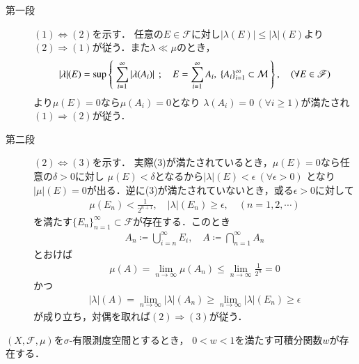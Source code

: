 	\begin{prf}\mbox{}
		\begin{description}
			\item[第一段]
				$(1) \Leftrightarrow (2)$を示す．
				任意の$E \in \mathscr{F}$に対し$|\lambda(E)| \leq |\lambda|(E)$より
				$(2) \Rightarrow (1)$が従う．また$\lambda \ll \mu$のとき，
				\begin{align}
					|\lambda|(E) =
					\operatorname*{sup}_{} \left\{\ \sum_{i=1}^{\infty} |\lambda(A_i)|\ \, ; \quad E = \sum_{i=1}^\infty A_i,\ \{A_i\}_{i=1}^\infty \subset \mathcal{M}\ \right\},
					\quad (\forall E \in \mathscr{F})
				\end{align}
				より$\mu(E) = 0$なら$\mu(A_i) = 0$となり
				$\lambda(A_i) = 0\ (\forall i \geq 1)$が満たされ
				$(1) \Rightarrow (2)$が従う．
				
			\item[第二段]
				$(2) \Leftrightarrow (3)$を示す．
				実際(3)が満たされているとき，$\mu(E) = 0$なら任意の$\delta > 0$に対し
				$\mu(E) < \delta$となるから$|\lambda|(E) < \epsilon\ (\forall \epsilon > 0)$
				となり$|\mu|(E) = 0$が出る．逆に(3)が満たされていないとき，或る$\epsilon > 0$に対して
				\begin{align}
					\mu(E_n) < \frac{1}{2^{n+1}}, \quad |\lambda|(E_n) \geq \epsilon,
					\quad (n=1,2,\cdots)
				\end{align}
				を満たす$\{E_n\}_{n=1}^\infty \subset \mathscr{F}$が存在する．このとき
				\begin{align}
					A_n \coloneqq \bigcup_{i=n}^\infty E_i,
					\quad A \coloneqq \bigcap_{n=1}^\infty A_n
				\end{align}
				とおけば
				\begin{align}
					\mu(A) = \lim_{n \to \infty} \mu(A_n) 
					\leq \lim_{n \to \infty} \frac{1}{2^n} = 0
				\end{align}
				かつ
				\begin{align}
					|\lambda|(A) = \lim_{n \to \infty} |\lambda|(A_n) 
					\geq \lim_{n \to \infty} |\lambda|(E_n) \geq \epsilon 
				\end{align}
				が成り立ち，対偶を取れば$(2) \Rightarrow (3)$が従う．
				\QED
		\end{description}
	\end{prf}
	
	\begin{screen}
		\begin{lem}\label{lem:Lebesgue_Radon_Nikodym}
			$(X,\mathscr{F},\mu)$を$\sigma$-有限測度空間とするとき，
			$0 < w < 1$を満たす可積分関数$w$が存在する．
		\end{lem}
	\end{screen}
	
